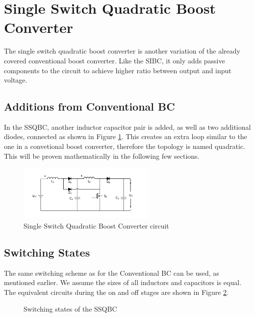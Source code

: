 \section{Single Switch Quadratic Boost Converter}\label{ch:SSQBC}

The single switch quadratic boost converter is another variation of the already covered conventional boost converter. Like the SIBC, it only adds passive components to the circuit to achieve higher ratio between output and input voltage. \cite{Zhang2012}

\subsection{Additions from Conventional BC}
In the SSQBC,
another inductor capacitor pair is added, as well as two additional diodes, connected as shown in Figure \ref{fig:SSQBC}. This creates an extra loop similar to the one in a convetional boost converter, therefore the topology is named quadratic. This will be proven mathematically in the following few sections.

\begin{figure} [H]
   \centering
   \includegraphics[width=0.6\textwidth]{figures/cSingleSwitchQuadraticBC/Quadratic_boost.pdf}
    \caption{Single Switch Quadratic Boost Converter circuit}
	\label{fig:SSQBC}
\end{figure}
\subsection{Switching States}
The same switching scheme as for the Conventional BC can be used,
as mentioned earlier. We assume the sizes of all inductors and capacitors is equal.
The equivalent circuits during the on and off stages are shown in Figure \ref{fig:SSQBC_States}.

\begin{figure}[H]%
    \centering
    \qquad
    \caption{Switching states of the SSQBC}%
     \label{fig:SSQBC_States}%
\end{figure}

